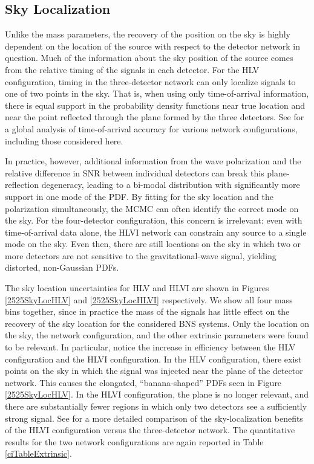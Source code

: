 \documentclass[11pt,a4paper]{emulateapj} 
\begin{document}
\subsection{Sky Localization}
\label{skySection}
 
Unlike the mass parameters, the recovery of the position on the sky is
highly dependent on the location of the source with respect to the
detector network in question.  Much of the information about the sky
position of the source comes from the relative timing of the signals
in each detector.  For the HLV configuration, timing in the
three-detector network can only localize signals to one of two points
in the sky.  That is, when using only time-of-arrival information,
there is equal support in the probability density functions near true
location and near the point reflected through the plane formed by the
three detectors.  See \cite{Fairhurst2011} for a global analysis of
time-of-arrival accuracy for various network configurations, including
those considered here.
  
  
In practice, however, additional information from the wave
polarization and the relative difference in SNR between individual
detectors can break this plane-reflection degeneracy, leading to a
bi-modal distribution with significantly more support in one mode of
the PDF.  By fitting for the sky location and the polarization
simultaneously, the MCMC can often identify the correct mode on the
sky.  For the four-detector configuration, this concern is irrelevant:
even with time-of-arrival data alone, the HLVI network can constrain
any source to a single mode on the sky.  Even then, there are still
locations on the sky in which two or more detectors are not sensitive
to the gravitational-wave signal, yielding distorted, non-Gaussian
PDFs.

The sky location uncertainties for HLV and HLVI are shown in Figures
\ref{2525SkyLocHLV} and \ref{2525SkyLocHLVI} respectively.  We show
all four mass bins together, since in practice the mass of the signals
has little effect on the recovery of the sky location for the
considered BNS systems.  Only the location on the sky, the network
configuration, and the other extrinsic parameters were found to be
relevant.  In particular, notice the increase in efficiency between
the HLV configuration and the HLVI configuration.  In the HLV
configuration, there exist points on the sky in which the signal was
injected near the plane of the detector network.  This causes the
elongated, ``banana-shaped'' PDFs seen in Figure \ref{2525SkyLocHLV}.
In the HLVI configuration, the plane is no longer relevant, and there
are substantially fewer regions in which only two detectors see a
sufficiently strong signal.  See \cite{Veitch2012} for a more detailed
comparison of the sky-localization benefits of the HLVI configuration
versus the three-detector network.  The quantitative
results for the two network configurations are again reported in Table
\ref{ciTableExtrinsic}.
\end{document}
